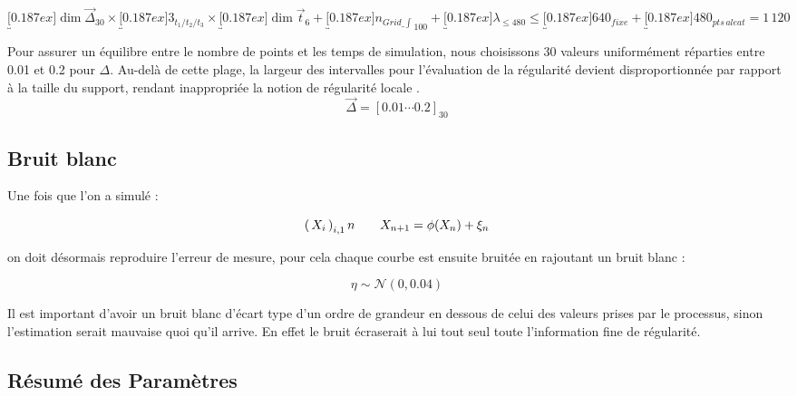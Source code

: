 $$\underbracket[0.187ex]{\dim \vec\Delta}_{30} \times \underbracket[0.187ex]{3}_{t_1 / t_2 / t_3} \times \underbracket[0.187ex]{\dim \vec t}_{6} + \underbracket[0.187ex]{n_{Grid\_\int}}_{100} + \underbracket[0.187ex]{\lambda}_{\leq 480} \leq \underbracket[0.187ex]{640}_{fixe} + \underbracket[0.187ex]{480}_{pts \, aleat} = 1 \, 120$$



Pour assurer un équilibre entre le nombre de points et les temps de simulation, nous choisissons 30 valeurs uniformément réparties entre 0.01 et 0.2 pour $\Delta$. Au-delà de cette plage, la largeur des intervalles pour l'évaluation de la régularité devient disproportionnée par rapport à la taille du support, rendant inappropriée la notion de \og régularité locale \fg.
$$
	\vec \Delta = \left[ 0.01 \cdots  0.2 \right]_{30}
$$

\subsection{Bruit blanc}


Une fois que l'on a simulé : 

$$
	\left( \, {X} _ {i} \, \right)_{i, 1} n \quad\quad X_{n+1} = \phi(X_n) + \xi_n
$$

on doit désormais reproduire l'erreur de mesure, pour cela chaque courbe est ensuite bruitée en rajoutant un bruit blanc :

$$
	\eta \sim \mathcal N ( 0, 0.04 )
$$

Il est important d'avoir un bruit blanc d'écart type d'un ordre de grandeur en dessous de celui des valeurs prises par le processus, sinon l'estimation serait mauvaise quoi qu'il arrive. En effet le bruit écraserait à lui tout seul toute l'information fine de régularité.


\subsection{Résumé des Paramètres}

